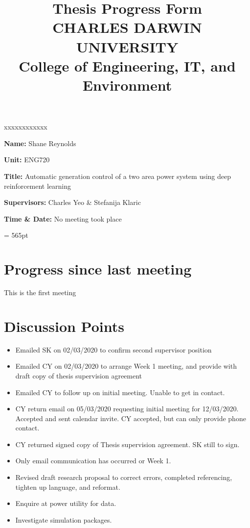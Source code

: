 \documentclass[12pt]{article}
\title{	
		Thesis Progress Form\\
		CHARLES DARWIN UNIVERSITY\\
		College of Engineering, IT, and Environment
	  }
\author{}
\date{}
\begin{document}
	
	\maketitle
	
	\begin{namelist}{xxxxxxxxxxxx}
		\item[{\bf Name:}]
			Shane Reynolds
		\item[{\bf Unit:}]
			ENG720
		\item[{\bf Title:}]
			Automatic generation control of a two area power system using deep reinforcement learning
		\item[{\bf Supervisors:}]
			Charles Yeo \& Stefanija Klaric
		\item[{\bf Time \& Date:}] No meeting took place
			
	\end{namelist}
	
	\pagestyle{plain} %
	\textheight = 565pt %
	
	\section{Progress since last meeting}
	This is the first meeting
	
	\section{Discussion Points}
		\begin{itemize}
			\item Emailed SK on 02/03/2020 to confirm second supervisor position
			
			\item Emailed CY on 02/03/2020 to arrange Week 1 meeting, and provide with draft copy of thesis supervision agreement
			
			\item Emailed CY to follow up on initial meeting. Unable to get in contact.
			
			\item CY return email on 05/03/2020 requesting initial meeting for 12/03/2020. Accepted and sent calendar invite. CY accepted, but can only provide phone contact.
			
			\item CY returned signed copy of Thesis supervision agreement. SK still to sign.
			
			\item Only email communication has occurred or Week 1.
			
			\item Revised draft research proposal to correct errors, completed referencing, tighten up language, and reformat.
			
			\item Enquire at power utility for data.
			
			\item Investigate simulation packages.
		\end{itemize}
	
\end{document}
